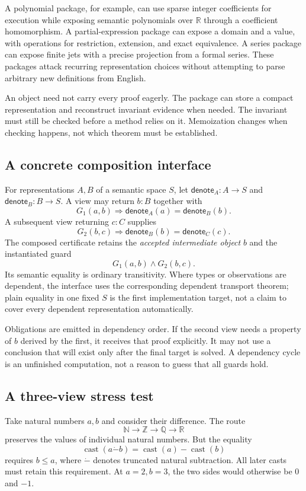 \documentclass[11pt,a4paper]{article}
\newcommand{\R}{\mathbb R}
\newcommand{\Q}{\mathbb Q}
\newcommand{\Z}{\mathbb Z}
\newcommand{\N}{\mathbb N}
\theoremstyle{remark}
\begin{document}
A polynomial package, for example, can use sparse integer coefficients for
execution while exposing semantic polynomials over $\R$ through a coefficient
homomorphism. A partial-expression package can expose a domain and a value,
with operations for restriction, extension, and exact equivalence. A series
package can expose finite jets with a precise projection from a formal series.
These packages attack recurring representation choices without attempting to
parse arbitrary new definitions from English.

An object need not carry every proof eagerly. The package can store a compact
representation and reconstruct invariant evidence when needed. The invariant
must still be checked before a method relies on it. Memoization changes when
checking happens, not which theorem must be established.

\subsection{A concrete composition interface}
For representations $A,B$ of a semantic space $S$, let
$\mathsf{denote}_A:A\to S$ and $\mathsf{denote}_B:B\to S$.
A view may return $b:B$ together with
\[
 G_1(a,b)\Longrightarrow
 \mathsf{denote}_A(a)=\mathsf{denote}_B(b).
\]
A subsequent view returning $c:C$ supplies
\[
 G_2(b,c)\Longrightarrow
 \mathsf{denote}_B(b)=\mathsf{denote}_C(c).
\]
The composed certificate retains the \emph{accepted intermediate object} $b$
and the instantiated guard
\[
 G_1(a,b)\wedge G_2(b,c).
\]
Its semantic equality is ordinary transitivity. Where types or observations are
dependent, the interface uses the corresponding dependent transport theorem;
plain equality in one fixed $S$ is the first implementation target, not a claim
to cover every dependent representation automatically.

Obligations are emitted in dependency order. If the second view needs a property
of $b$ derived by the first, it receives that proof explicitly. It may not use a
conclusion that will exist only after the final target is solved. A dependency
cycle is an unfinished computation, not a reason to guess that all guards hold.

\subsection{A three-view stress test}
Take natural numbers $a,b$ and consider their difference. The route
\[
 \N\longrightarrow\Z\longrightarrow\Q\longrightarrow\R
\]
preserves the values of individual natural numbers. But the equality
\[
 \operatorname{cast}(a\mathbin{\dot-}b)
     =\operatorname{cast}(a)-\operatorname{cast}(b)
\]
requires $b\le a$, where $\dot-$ denotes truncated natural subtraction.
All later casts must retain this requirement. At $a=2,b=3$, the two sides would
otherwise be $0$ and $-1$.
\end{document}
